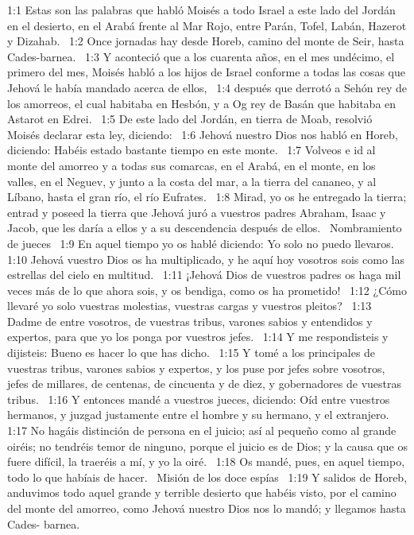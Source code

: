 1:1 Estas son las palabras que habló Moisés a todo Israel a este lado del Jordán en el desierto, en el Arabá frente al Mar Rojo, entre Parán, Tofel, Labán, Hazerot y Dizahab.  
1:2 Once jornadas hay desde Horeb, camino del monte de Seir, hasta Cades-barnea.  
1:3 Y aconteció que a los cuarenta años, en el mes undécimo, el primero del mes, Moisés habló a los hijos de Israel conforme a todas las cosas que Jehová le había mandado acerca de ellos,  
1:4 después que derrotó a Sehón rey de los amorreos, el cual habitaba en Hesbón, y a Og rey de Basán que habitaba en Astarot en Edrei.  
1:5 De este lado del Jordán, en tierra de Moab, resolvió Moisés declarar esta ley, diciendo:  
1:6 Jehová nuestro Dios nos habló en Horeb, diciendo: Habéis estado bastante tiempo en este monte.  
1:7 Volveos e id al monte del amorreo y a todas sus comarcas, en el Arabá, en el monte, en los valles, en el Neguev, y junto a la costa del mar, a la tierra del cananeo, y al Líbano, hasta el gran río, el río Eufrates.  
1:8 Mirad, yo os he entregado la tierra; entrad y poseed la tierra que Jehová juró a vuestros padres Abraham, Isaac y Jacob, que les daría a ellos y a su descendencia después de ellos.  
Nombramiento de jueces   
1:9 En aquel tiempo yo os hablé diciendo: Yo solo no puedo llevaros.  
1:10 Jehová vuestro Dios os ha multiplicado, y he aquí hoy vosotros sois como las estrellas del cielo en multitud.  
1:11 ¡Jehová Dios de vuestros padres os haga mil veces más de lo que ahora sois, y os bendiga, como os ha prometido!  
1:12 ¿Cómo llevaré yo solo vuestras molestias, vuestras cargas y vuestros pleitos?  
1:13 Dadme de entre vosotros, de vuestras tribus, varones sabios y entendidos y expertos, para que yo los ponga por vuestros jefes.  
1:14 Y me respondisteis y dijisteis: Bueno es hacer lo que has dicho.  
1:15 Y tomé a los principales de vuestras tribus, varones sabios y expertos, y los puse por jefes sobre vosotros, jefes de millares, de centenas, de cincuenta y de diez, y gobernadores de vuestras tribus.  
1:16 Y entonces mandé a vuestros jueces, diciendo: Oíd entre vuestros hermanos, y juzgad justamente entre el hombre y su hermano, y el extranjero.  
1:17 No hagáis distinción de persona en el juicio; así al pequeño como al grande oiréis; no tendréis temor de ninguno, porque el juicio es de Dios; y la causa que os fuere difícil, la traeréis a mí, y yo la oiré.  
1:18 Os mandé, pues, en aquel tiempo, todo lo que habíais de hacer.  
Misión de los doce espías   
1:19 Y salidos de Horeb, anduvimos todo aquel grande y terrible desierto que habéis visto, por el camino del monte del amorreo, como Jehová nuestro Dios nos lo mandó; y llegamos hasta Cades- barnea.  

